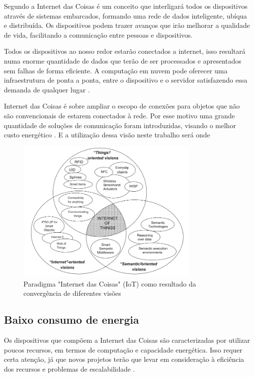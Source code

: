Segundo \cite{xia:2012} a Internet das Coisas é um conceito que interligará todos os dispositivos através de sistemas embarcados, formando uma rede de dados inteligente, ubíqua e distribuída. Os dispositivos podem trazer avanços que irão melhorar a qualidade de vida, facilitando a comunicação entre pessoas e dispositivos.

Todos os dispositivos ao nosso redor estarão conectados a internet, isso resultará numa enorme quantidade de dados que terão de ser processados e apresentados sem falhas de forma eficiente. A computação em nuvem pode oferecer uma infraestrutura de ponta a ponta, entre o dispositivo e o servidor satisfazendo essa demanda de qualquer lugar \cite{Gubbi:2013}.

Internet das Coisas é sobre ampliar o escopo de conexões para objetos que não são convencionais de estarem conectados à rede. Por esse motivo uma grande quantidade de soluções de comunicação foram introduzidas, visando o melhor custo energético \cite{siekkinen2012low}. E a utilização dessa visão neste trabalho será onde 

 \begin{figure}[H]
	\centering
    	\caption{\label{fig:iotoverview} Paradigma "Internet das Coisas" (IoT) como resultado da convergência de diferentes visões }
		\includegraphics[width = 0.8\textwidth]	{resources/iotoverview}
\end{figure}



\subsection{Baixo consumo de energia}
Os dispositivos que compõem a Internet das Coisas são caracterizadas por utilizar poucos recursos, em termos de computação e capacidade energética. Isso requer certa atenção, já que novos projetos terão que levar em consideração à eficiência dos recursos e problemas de escalabilidade \cite{atzori2010internet}.

